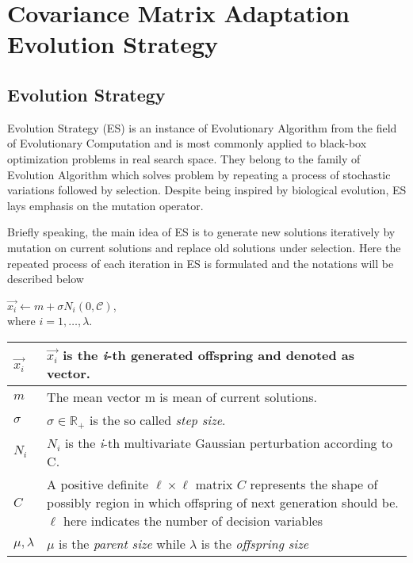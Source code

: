\section{Covariance Matrix Adaptation Evolution Strategy}
\label{sec:CMA-ES}


\subsection{Evolution Strategy} \label{ES}

Evolution Strategy (ES) is an instance of Evolutionary Algorithm from
the field of Evolutionary Computation and is most commonly applied to
black-box optimization problems in real search space.  They belong to
the family of Evolution Algorithm which solves problem by repeating a
process of stochastic variations followed by selection.  Despite being
inspired by biological evolution, ES lays emphasis on the mutation
operator.

Briefly speaking, the main idea of ES is to generate new solutions
iteratively by mutation on current solutions and replace old solutions
under selection.  Here the repeated process of each iteration in ES is
formulated and the notations will be described below

\begin{center} {\large $\vec{x_i} \leftarrow m + \sigma
  N_i(0,\mathcal{C})$,\\ where $i = 1,\ldots, \lambda$.}



  \begin{tabular}{|>{\centering} m{0.7in} | m{4.2in}|} \hline
    $\vec{x_i}$    & $\vec{x_i}$ is the \textit{i}-th generated
    offspring and denoted as vector.\\\hline $m$      & The mean vector
    m is mean of current solutions.\\\hline $\sigma$ &  $\sigma \in
    \mathbb{R}_+$ is the so called \emph{step size}.\\\hline $N_i$    &
    $N_i$ is the \textit{i}-th multivariate Gaussian perturbation
    according to C.\\\hline $C$      & A positive definite $\ell \times
    \ell$ matrix $C$ represents the shape of possibly region in which
    offspring of next generation should be.$\ell$ here indicates the
    number of decision variables\\\hline $\mu,\lambda$ & $\mu$ is the
    \emph{parent size} while $\lambda$ is the \emph{offspring
    size}\\\hline \end{tabular} \end{center}

